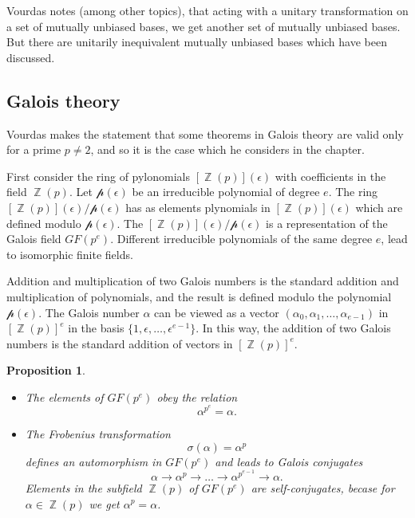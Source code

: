 \documentclass[a4paper]{article}
\DeclareMathOperator{\Z}{\mathbb{Z}}
\newtheorem{proposition}{Proposition}
\begin{document}
  Vourdas notes (among other topics), that acting with a
  unitary transformation on a set of mutually unbiased
  bases, we get another set of mutually unbiased bases. But
  there are unitarily inequivalent mutually unbiased bases
  which have been discussed.

  \subsection{Galois theory}

  Vourdas makes the statement that some theorems in Galois
  theory are valid only for a prime $p \neq 2$, and so it is
  the case which he considers in the chapter.

  First consider the ring of pylonomials $[\Z(p)](\epsilon)$ 
  with coefficients in the field $\Z(p)$. Let
  $\mathcal{p}(\epsilon)$ be an irreducible polynomial of
  degree $e$. The ring $[\Z(p)](\epsilon) /
  \mathcal{p}(\epsilon)$ has as elements plynomials in
  $[\Z(p)](\epsilon)$ which are defined modulo
  $\mathcal{p}(\epsilon)$. The $[\Z(p)](\epsilon) /
  \mathcal{p}(\epsilon)$ is a representation of the Galois
  field $GF(p^{e})$. Different irreducible polynomials of
  the same degree $e$, lead to isomorphic finite fields.
  
  Addition and multiplication of two Galois numbers is the
  standard addition and multiplication of polynomials, and
  the result is defined modulo the polynomial
  $\mathcal{p}(\epsilon)$. The Galois number $\alpha$ can be
  viewed as a vector
  $(\alpha_0,\alpha_1,\ldots,\alpha_{e-1})$ in $[\Z(p)]^{e}$ 
  in the basis $\{1,\epsilon,\ldots,\epsilon^{e-1}\}$. In
  this way, the addition of two Galois numbers is the
  standard addition of vectors in $[\Z(p)]^{e}$.

  \begin{proposition}
    \begin{itemize}
      \item The elements of $GF(p^{e})$ obey the relation
        \[
          \alpha^{p^{e}} = \alpha.
        \] 
      \item The Frobenius transformation
        \[
          \sigma(\alpha) = \alpha^{p}
        \] 
        defines an automorphism in $GF(p^{e})$ and leads to
        Galois conjugates
        \[
          \alpha \to \alpha^{p} \to \ldots \to
          \alpha^{p^{e-1}} \to \alpha.
        \] 
        Elements in the subfield $\Z(p)$ of $GF(p^{e})$ are
        self-conjugates, becase for $\alpha \in \Z(p)$ we
        get $\alpha^{p} = \alpha$.
    \end{itemize}
  \end{proposition}
\end{document}
